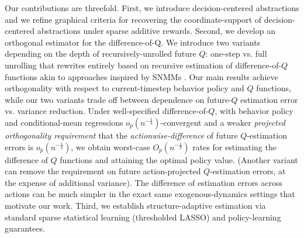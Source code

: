 \documentclass[opre,nonblindrev]{informs4}
\begin{document}
Our contributions are threefold. First, we introduce decision-centered abstractions and we refine graphical criteria for recovering the coordinate-support of decision-centered abstractions under sparse additive rewards. Second, we develop an orthogonal estimator for the difference-of-Q. We introduce two variants depending on the depth of recursively-unrolled future $Q$: one-step vs. full unrolling that rewrites entirely based on recursive estimation of difference-of-$Q$ functions  akin to approaches inspired by SNMMs \citep{robins2004optimal}. 
Our main results achieve orthogonality with respect to current-timestep behavior policy and $Q$ functions, while our two variants trade off between dependence on future-$Q$ estimation error vs. variance reduction. 
Under well-specified difference-of-$Q$, with behavior policy and conditional-mean regressions $o_p(n^{-\frac 14})$-convergent and a weaker \textit{projected orthogonality requirement} that the \textit{actionwise-difference} of future $Q$-estimation errors is $o_p(n^{-\frac 12})$, we obtain worst-case $O_p(n^{-\frac 12})$ rates for estimating the difference of $Q$ functions and attaining the optimal policy value. (Another variant can remove the requirement on future action-projected $Q$-estimation errors, at the expense of additional variance). The difference of estimation errors across actions can be much simpler in the exact same exogenous-dynamics settings that motivate our work. Third, we establish structure-adaptive estimation via standard sparse statistical learning (thresholded LASSO) and policy-learning guarantees. 
\end{document}
